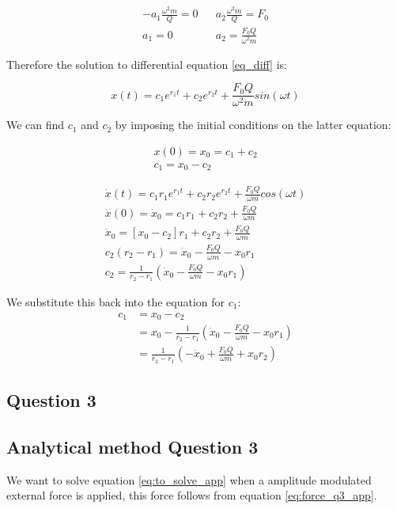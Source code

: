 \begin{align*}
	- a_1 \frac{\omega^2 m}{Q} = 0 &  &  a_2 \frac{\omega^2 m}{Q} = F_0 \\
	a_1 = 0 &  & a_2 = \frac{F_0 Q}{\omega^2 m}
\end{align*}

Therefore the solution to differential equation \ref{eq_diff} is:

\begin{equation*}
	x(t) = c_1 e^{r_1 t} + c_2 e^{r_2 t} + \frac{F_0 Q}{\omega^2 m}sin(\omega t)
\end{equation*}

We can find $c_1$ and $c_2$ by imposing the initial conditions on the latter equation:

\begin{align*}
	x(0) = x_0 = c_1 + c_2 \\
	c_1 = x_0 - c_2
\end{align*}

\begin{align*}
	\dot{x}(t) = c_1 r_1 e^{r_1 t} + c_2 r_2 e^{r_2 t} + \frac{F_0 Q}{\omega m} cos(\omega t) \\
	\dot{x}(0) = \dot{x}_0 = c_1 r_1 + c_2 r_2 + \frac{F_0 Q}{\omega m} \\
	\dot{x}_0 = [x_0-c_2] r_1 + c_2 r_2 + \frac{F_0 Q}{\omega m} \\
	c_2(r_2 - r_1) = \dot{x}_0 - \frac{F_0 Q}{\omega m} -x_0 r_1 \\
	c_2 = \frac{1}{r_2-r_1} \left( \dot{x}_0 - \frac{F_0 Q}{\omega m} - x_0 r_1 \right)
\end{align*}

We substitute this back into the equation for $c_1$:
\begin{align*}
	c_1 &= x_0 - c_2 \\
	&= x_0 - \frac{1}{r_2-r_1} \left( \dot{x}_0 - \frac{F_0 Q}{\omega m} - x_0 r_1 \right) \\
	&= \frac{1}{r_2-r_1} \left( -\dot{x}_0 + \frac{F_0 Q}{\omega m} + x_0  r_2  \right)
\end{align*}



\subsection{Question 3}

\lstset{label=PythonCode}


\subsection{Analytical method Question 3}
We want to solve equation \ref{eq:to_solve_app} when a amplitude modulated external force is applied, this force follows from equation \ref{eq:force_q3_app}.\\

